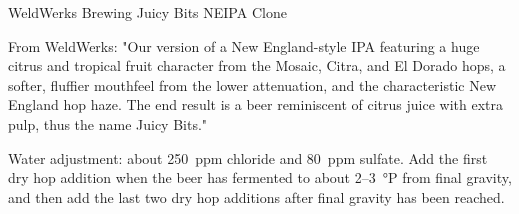 \begin{recipie}{WeldWerks Brewing Juicy Bits NEIPA Clone}

\begin{aboutblock}
From WeldWerks: "Our version of a New England-style IPA featuring a huge citrus
and tropical fruit character from the Mosaic, Citra, and El Dorado hops, a softer,
fluffier mouthfeel from the lower attenuation, and the characteristic New England
hop haze. The end result is a beer reminiscent of citrus juice with extra pulp,
thus the name Juicy Bits." 
\end{aboutblock}


\begin{methodandtiming}
 
\begin{mashsteps}
\end{mashsteps}

\begin{fermentationsteps}
\end{fermentationsteps}

\begin{directions}
Water adjustment: about 250~ppm chloride and 80~ppm sulfate. Add the first dry hop
addition when the beer has fermented to about 2--3~°P from final gravity,
and then add the last two dry hop additions after final gravity has been reached.
\end{directions}

\end{methodandtiming}

\pagebreak

\begin{ingredientsblock}

\begin{malts}
\end{malts}


\end{ingredientsblock}
\end{recipie}
